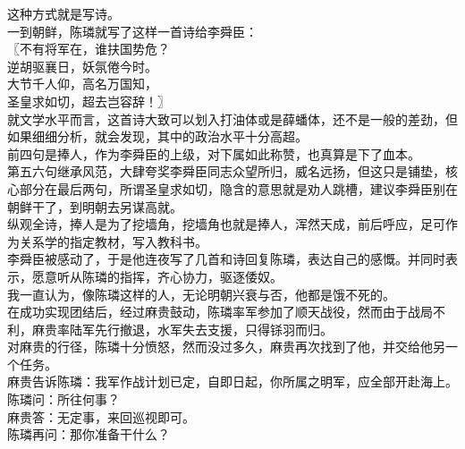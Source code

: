 \begin{multicols}{\theparacolNo}
这种方式就是写诗。\\

一到朝鲜，陈璘就写了这样一首诗给李舜臣：\\

〖不有将军在，谁扶国势危？\\

逆胡驱襄日，妖氛倦今时。\\

大节千人仰，高名万国知，\\

圣皇求如切，超去岂容辞！〗\\

就文学水平而言，这首诗大致可以划入打油体或是薛蟠体，还不是一般的差劲，但如果细细分析，就会发现，其中的政治水平十分高超。\\

前四句是捧人，作为李舜臣的上级，对下属如此称赞，也真算是下了血本。\\

第五六句继承风范，大肆夸奖李舜臣同志众望所归，威名远扬，但这只是铺垫，核心部分在最后两句，所谓圣皇求如切，隐含的意思就是劝人跳槽，建议李舜臣别在朝鲜干了，到明朝去另谋高就。\\

纵观全诗，捧人是为了挖墙角，挖墙角也就是捧人，浑然天成，前后呼应，足可作为关系学的指定教材，写入教科书。\\

李舜臣被感动了，于是他连夜写了几首和诗回复陈璘，表达自己的感慨。并同时表示，愿意听从陈璘的指挥，齐心协力，驱逐倭奴。\\

我一直认为，像陈璘这样的人，无论明朝兴衰与否，他都是饿不死的。\\

在成功实现团结后，经过麻贵鼓动，陈璘率军参加了顺天战役，然而由于战局不利，麻贵率陆军先行撤退，水军失去支援，只得铩羽而归。\\

对麻贵的行径，陈璘十分愤怒，然而没过多久，麻贵再次找到了他，并交给他另一个任务。\\

麻贵告诉陈璘：我军作战计划已定，自即日起，你所属之明军，应全部开赴海上。\\

陈璘问：所往何事？\\

麻贵答：无定事，来回巡视即可。\\

陈璘再问：那你准备干什么？\\


\end{multicols}

